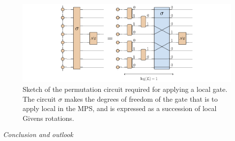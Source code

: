 \documentclass[a4paper, twocolumn, superscriptaddress, longbibliography]{revtex4-2}
\begin{document}
	\begin{figure}[t]
		\centering
		\includegraphics[width=1.\textwidth]{Figs/Sketch/Sketch_permutation.pdf}
		\caption{Sketch of the permutation circuit required for applying a local gate. The circuit $\sigma$ makes the degrees of freedom of the gate that is to apply local in the MPS, and is expressed as a succession of local Givens rotations.}
		\label{fig:permutation}
	\end{figure}


	\emph{Conclusion and outlook}


	

      \begin{appendices}
	\end{appendices}
\end{document}
